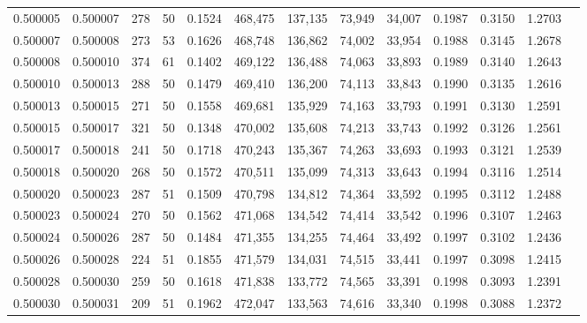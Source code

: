 \begin{tabular}{rrrrrrrrrrrrr}
0.500005 & 0.500007 & 278 &  50 &                                     0.1524 & 468,475 & 137,135 &  73,949 &  34,007 & 0.1987 & 0.3150 & 1.2703 \\
0.500007 & 0.500008 & 273 &  53 &                                     0.1626 & 468,748 & 136,862 &  74,002 &  33,954 & 0.1988 & 0.3145 & 1.2678 \\
0.500008 & 0.500010 & 374 &  61 &                                     0.1402 & 469,122 & 136,488 &  74,063 &  33,893 & 0.1989 & 0.3140 & 1.2643 \\
0.500010 & 0.500013 & 288 &  50 &                                     0.1479 & 469,410 & 136,200 &  74,113 &  33,843 & 0.1990 & 0.3135 & 1.2616 \\
0.500013 & 0.500015 & 271 &  50 &                                     0.1558 & 469,681 & 135,929 &  74,163 &  33,793 & 0.1991 & 0.3130 & 1.2591 \\
0.500015 & 0.500017 & 321 &  50 &                                     0.1348 & 470,002 & 135,608 &  74,213 &  33,743 & 0.1992 & 0.3126 & 1.2561 \\
0.500017 & 0.500018 & 241 &  50 &                                     0.1718 & 470,243 & 135,367 &  74,263 &  33,693 & 0.1993 & 0.3121 & 1.2539 \\
0.500018 & 0.500020 & 268 &  50 &                                     0.1572 & 470,511 & 135,099 &  74,313 &  33,643 & 0.1994 & 0.3116 & 1.2514 \\
0.500020 & 0.500023 & 287 &  51 &                                     0.1509 & 470,798 & 134,812 &  74,364 &  33,592 & 0.1995 & 0.3112 & 1.2488 \\
0.500023 & 0.500024 & 270 &  50 &                                     0.1562 & 471,068 & 134,542 &  74,414 &  33,542 & 0.1996 & 0.3107 & 1.2463 \\
0.500024 & 0.500026 & 287 &  50 &                                     0.1484 & 471,355 & 134,255 &  74,464 &  33,492 & 0.1997 & 0.3102 & 1.2436 \\
0.500026 & 0.500028 & 224 &  51 &                                     0.1855 & 471,579 & 134,031 &  74,515 &  33,441 & 0.1997 & 0.3098 & 1.2415 \\
0.500028 & 0.500030 & 259 &  50 &                                     0.1618 & 471,838 & 133,772 &  74,565 &  33,391 & 0.1998 & 0.3093 & 1.2391 \\
0.500030 & 0.500031 & 209 &  51 &                                     0.1962 & 472,047 & 133,563 &  74,616 &  33,340 & 0.1998 & 0.3088 & 1.2372 \\

\end{tabular}
